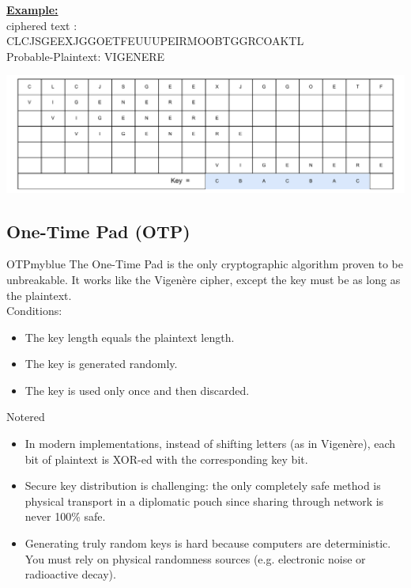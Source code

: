 \vspace{0.75cm}
\textbf{\underline{Example:}}\\[0.25cm]
ciphered text :\\[0.15cm]
CLCJSGEEXJGGOETFEUUUPEIRMOOBTGGRCOAKTL\\[0.15cm]
Probable-Plaintext: VIGENERE
\begin{center} 
    \includegraphics[height=0.2\textheight]{Chapters/Diagram/Crypto/mo.drawio.pdf}
\end{center}

\newpage

\subsection{One-Time Pad (OTP)}

\begin{prettyBox}{OTP}{myblue}
The One-Time Pad is the only cryptographic algorithm proven to be unbreakable.  
It works like the Vigenère cipher, except the key must be as long as the plaintext.\\[0.5cm]
Conditions:
\begin{itemize}
    \item The key length equals the plaintext length.
    \item The key is generated randomly.
    \item The key is used only once and then discarded.
\end{itemize}
\end{prettyBox}

\vspace{0.5cm}

\begin{prettyBox}{Note}{red}
\begin{itemize}
    \item In modern implementations, instead of shifting letters (as in Vigenère), each bit of plaintext is XOR-ed with the corresponding key bit.
    \item Secure key distribution is challenging: the only completely safe method is physical transport in a diplomatic pouch since sharing through network is never 100\% safe.
    \item Generating truly random keys is hard because computers are deterministic. You must rely on physical randomness sources (e.g. electronic noise or radioactive decay).
\end{itemize}
\end{prettyBox}

